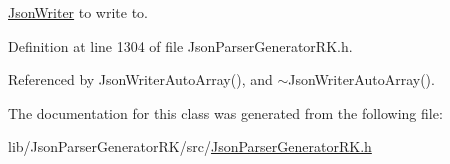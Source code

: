 \hyperlink{class_json_writer}{Json\+Writer} to write to. 



Definition at line 1304 of file Json\+Parser\+Generator\+R\+K.\+h.



Referenced by Json\+Writer\+Auto\+Array(), and $\sim$\+Json\+Writer\+Auto\+Array().



The documentation for this class was generated from the following file\+:\begin{DoxyCompactItemize}
\item 
lib/\+Json\+Parser\+Generator\+R\+K/src/\hyperlink{_json_parser_generator_r_k_8h}{Json\+Parser\+Generator\+R\+K.\+h}\end{DoxyCompactItemize}
